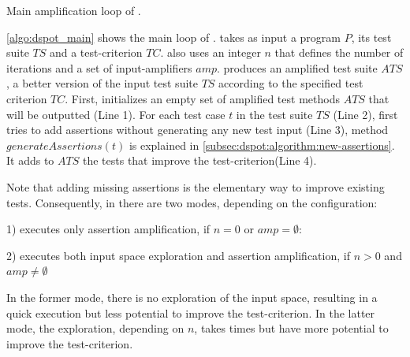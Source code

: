 \begin{algorithm}[t]
	\begin{algorithmic}[1]
		\EndFor
		\EndFor
		\EndFor
	\end{algorithmic}
	\caption{Main amplification loop of \dspot.}
	\label{algo:dspot_main}
\end{algorithm}

\autoref{algo:dspot_main} shows the main loop of \dspot. 
\dspot takes as input a program $P$, its test suite $TS$ and a test-criterion $TC$. 
\dspot also uses an integer $n$ that defines the number of iterations and a set of input-amplifiers $amp$.
\dspot produces an amplified test suite $ATS$, \ie a better version of the input test suite $TS$ according to the specified test criterion $TC$.
First, \dspot initializes an empty set of amplified test methods $ATS$ that will be outputted (Line 1).
For each test case $t$ in the test suite $TS$ (Line 2), 
\dspot first tries to add assertions without generating any new test input (Line 3), method $generateAssertions\left(t\right)$ is explained in \autoref{subsec:dspot:algorithm:new-assertions}.
It adds to $ATS$ the tests that improve the test-criterion(Line 4).

Note that adding missing assertions is the elementary way to improve existing tests.
Consequently, in \dspot there are two modes, depending on the configuration:

1) \dspot executes only assertion amplification, if $n = 0$ or $amp = \emptyset $:

2) \dspot executes both input space exploration and assertion amplification, if $n > 0$ and $amp \ne \emptyset$

In the former mode, there is no exploration of the input space, resulting in a quick execution but less potential to improve the test-criterion.
In the latter mode, the exploration, depending on $n$, takes times but have more potential to improve the test-criterion.

